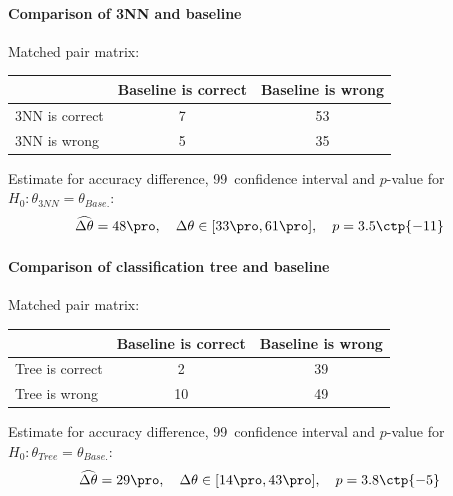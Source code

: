 \documentclass[11pt,fleqn]{article}
\begin{document}
\paragraph{Comparison of 3NN and baseline}
Matched pair matrix:

\begin{table}[H]
	\centering
	\begin{tabular}{l|c c}
		&Baseline is correct& Baseline is wrong \\
		\hline
		3NN is correct &7& 53\\
		3NN is wrong& 5& 35
	\end{tabular}
\end{table}\noindent 
Estimate for accuracy difference, 99\pro\ confidence interval and \(p\)-value for \(H_0: \theta_{3NN}=\theta_{Base.}\):
\[
\widehat{\Delta \theta} = 48\pro,\quad  \Delta \theta\in[33\pro , 61\pro], \quad p = 3.5\ctp{-11}
\]

\paragraph{Comparison of classification tree and baseline}
Matched pair matrix:

\begin{table}[H]
	\centering
	\begin{tabular}{l|c c}
		&Baseline is correct& Baseline is wrong \\
		\hline
		Tree is correct &2& 39\\
		Tree is wrong& 10& 49
	\end{tabular}
\end{table}\noindent 
Estimate for accuracy difference, 99\pro\ confidence interval and \(p\)-value for \(H_0: \theta_{Tree}=\theta_{Base.}\):
\[
\widehat{\Delta \theta} = 29\pro,\quad  \Delta \theta\in[14\pro , 43\pro], \quad p = 3.8\ctp{-5}
\]
\end{document}
